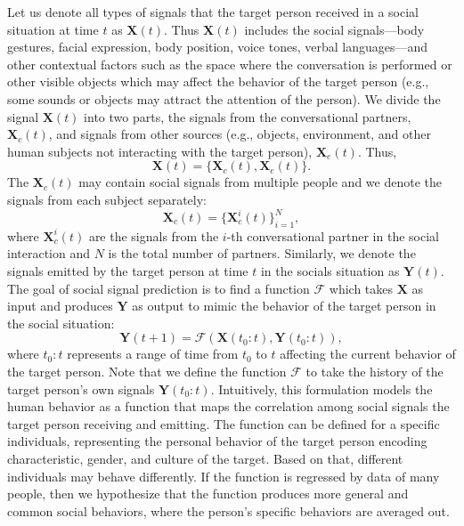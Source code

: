 Let us denote all types of signals that the target person received in a social situation at time $t$ as $\mathbf{X}(t)$. Thus $\mathbf{X}(t)$ includes the social signals---body gestures, facial expression, body position, voice tones, verbal languages---and other contextual factors such as the space where the conversation is performed or other visible objects which may affect the behavior of the target person (e.g., some sounds or objects may attract the attention of the person). We divide the signal $\mathbf{X}(t)$ into two parts, the signals from the conversational partners, $\mathbf{X}_c(t)$, and signals from other sources (e.g., objects, environment, and other human subjects not interacting with the target person), $\mathbf{X}_e(t)$.  Thus,
\begin{equation}
\mathbf{X} (t) = \{  \mathbf{X}_c (t), \mathbf{X}_e (t)\}.
\end{equation}
The $\mathbf{X}_c (t)$ may contain social signals from multiple people and we denote the signals from each subject separately:
\begin{equation}
\mathbf{X}_c (t) = \{ \mathbf{X}_c^i (t) \}_{i=1}^N,
\end{equation}
where $\mathbf{X}^i_c (t)$ are the signals from the $i$-th conversational partner in the social interaction and $N$ is the total number of partners. 
Similarly, we denote the signals emitted by the target person at time $t$ in the socials situation as $\mathbf{Y} (t)$.
The goal of social signal prediction is to find a function $\mathcal{F}$ which takes $\mathbf{X}$ as input and produces $\mathbf{Y}$ as output to mimic the behavior of the target person in the social situation:
\begin{equation}
\mathbf{Y} (t+1) = \mathcal{F} \left( \mathbf{X} (t_0:t), \mathbf{Y} (t_0:t) \right),
\label{equation:socialPrediction_1}
\end{equation}
where $t_0:t$ represents a range of time from $t_0$ to $t$ affecting the current behavior of the target person. Note that we define the function $\mathcal{F}$ to take the history of the target person's own signals $\mathbf{Y} (t_0:t)$. Intuitively, this formulation models the human behavior as a function that maps the correlation among social signals the target person receiving and emitting. The function can be defined for a specific individuals, representing the personal behavior of the target person encoding characteristic, gender, and culture of the target. Based on that, different individuals may behave differently. If the function is regressed by data of many people, then we hypothesize that the function produces more general and common social behaviors, where the person's specific behaviors are averaged out.

